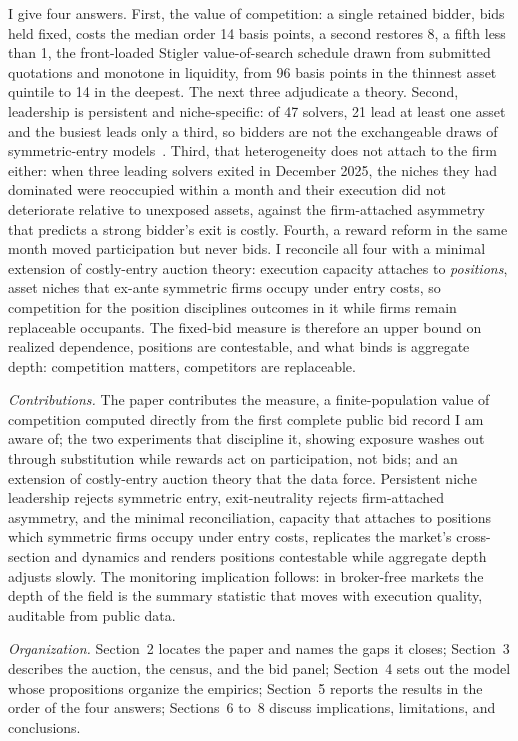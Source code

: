 \documentclass[11pt]{article}
\theoremstyle{plain}
\theoremstyle{definition}
\theoremstyle{remark}
\begin{document}
I give four answers. First, the value of competition: a single retained bidder, bids held fixed, costs the median order 14 basis points, a second restores 8, a fifth less than 1, the front-loaded Stigler value-of-search schedule drawn from submitted quotations and monotone in liquidity, from 96 basis points in the thinnest asset quintile to 14 in the deepest. The next three adjudicate a theory. Second, leadership is persistent and niche-specific: of 47 solvers, 21 lead at least one asset and the busiest leads only a third, so bidders are not the exchangeable draws of symmetric-entry models~\citep{levin1994entry}. Third, that heterogeneity does not attach to the firm either: when three leading solvers exited in December 2025, the niches they had dominated were reoccupied within a month and their execution did not deteriorate relative to unexposed assets, against the firm-attached asymmetry~\citep{maskin2000asymmetric} that predicts a strong bidder's exit is costly. Fourth, a reward reform in the same month moved participation but never bids. I reconcile all four with a minimal extension of costly-entry auction theory: execution capacity attaches to \emph{positions}, asset niches that ex-ante symmetric firms occupy under entry costs, so competition for the position disciplines outcomes in it while firms remain replaceable occupants. The fixed-bid measure is therefore an upper bound on realized dependence, positions are contestable, and what binds is aggregate depth: competition matters, competitors are replaceable.

\emph{Contributions.} The paper contributes the measure, a finite-population value of competition computed directly from the first complete public bid record I am aware of; the two experiments that discipline it, showing exposure washes out through substitution while rewards act on participation, not bids; and an extension of costly-entry auction theory that the data force. Persistent niche leadership rejects symmetric entry, exit-neutrality rejects firm-attached asymmetry, and the minimal reconciliation, capacity that attaches to positions which symmetric firms occupy under entry costs, replicates the market's cross-section and dynamics and renders positions contestable while aggregate depth adjusts slowly. The monitoring implication follows: in broker-free markets the depth of the field is the summary statistic that moves with execution quality, auditable from public data.

\emph{Organization.} Section~2 locates the paper and names the gaps it closes; Section~3 describes the auction, the census, and the bid panel; Section~4 sets out the model whose propositions organize the empirics; Section~5 reports the results in the order of the four answers; Sections~6 to~8 discuss implications, limitations, and conclusions.
\end{document}
